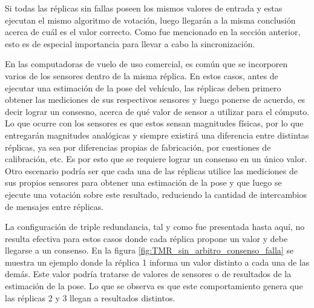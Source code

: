 Si todas las réplicas sin fallas poseen los mismos valores de entrada y estas ejecutan el mismo algoritmo de votación, luego llegarán a la misma conclusión acerca de cuál es el valor correcto. Como fue mencionado en la sección anterior, esto es de especial importancia para llevar a cabo la sincronización. 

En las computadoras de vuelo de uso comercial, es común que se incorporen varios de los sensores dentro de la misma réplica. En estos casos, antes de ejecutar una estimación de la pose del vehículo, las réplicas deben primero obtener las mediciones de sus respectivos sensores y luego ponerse de acuerdo, es decir lograr un consesno, acerca de qué valor de sensor a utilizar para el cómputo. Lo que ocurre con los sensores es que estos sensan magnitudes físicas, por lo que entregarán magnitudes analógicas y siempre existirá una diferencia entre distintas réplicas, ya sea por diferencias propias de fabricación, por cuestiones de calibración, etc. Es por esto que se requiere lograr un consenso en un único valor. Otro escenario podría ser que cada una de las réplicas utilice las mediciones de sus propios sensores para obtener una estimación de la pose y que luego se ejecute una votación sobre este resultado, reduciendo la cantidad de intercambios de mensajes entre réplicas.

La configuración de triple redundancia, tal y como fue presentada hasta aquí, no resulta efectiva para estos casos donde cada réplica propone un valor y debe llegarse a un consenso. En la figura \ref{fig:TMR_sin_arbitro_consenso_falla} se muestra un ejemplo donde la réplica 1 informa un valor distinto a cada una de las demás. Este valor podría tratarse de valores de sensores o de resultados de la estimación de la pose. Lo que se observa es que este comportamiento genera que las réplicas 2 y 3 llegan a resultados distintos.


